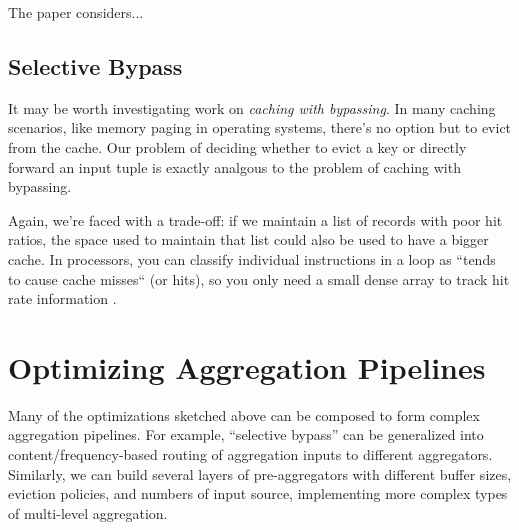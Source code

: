 \documentclass[12pt]{article}
\begin{document}
The paper \cite{competitive-reordering-algorithm} considers...



\subsection{Selective Bypass}
It may be worth investigating work on \emph{caching with bypassing}.  In many caching scenarios, like memory paging in operating systems, there's no option but to evict from the cache.  Our problem of deciding whether to evict a key or directly forward an input tuple is exactly analgous to the problem of caching with bypassing.

Again, we're faced with a trade-off: if we maintain a list of records with poor hit ratios, the space used to maintain that list could also be used to have a bigger cache.  In processors, you can classify individual instructions in a loop as ``tends to cause cache misses`` (or hits), so you only need a small dense array to track hit rate information \cite{automatic-cache-bypass}.










\pagebreak
\section{Optimizing Aggregation Pipelines}
Many of the optimizations sketched above can be composed to form complex
aggregation pipelines.  For example, ``selective bypass'' can be generalized
into content/frequency-based routing of aggregation inputs to different
aggregators.  Similarly, we can build several layers of pre-aggregators with
different buffer sizes, eviction policies, and numbers of input source,
implementing more complex types of multi-level aggregation.
\end{document}
